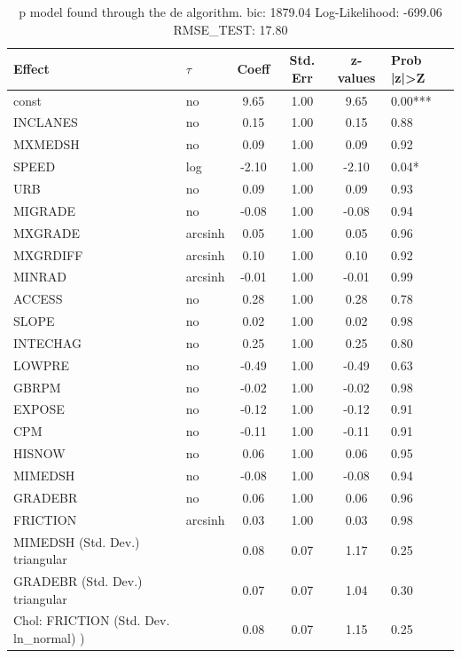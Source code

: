 \begin{table}
	\caption{p model found through the de algorithm. bic: 1879.04 Log-Likelihood: -699.06 RMSE_TEST: 17.80}
	\begin{center}
		\begin{tabular}{|l|l|c|c|c|l|}
			\hline
			Effect & $\tau$ & Coeff & Std. Err & z-values & Prob |z|>Z \\
			\hline
			const & no & 9.65 & 1.00 & 9.65 & 0.00*** \\
			\hline
			INCLANES & no & 0.15 & 1.00 & 0.15 & 0.88 \\
			\hline
			MXMEDSH & no & 0.09 & 1.00 & 0.09 & 0.92 \\
			\hline
			SPEED & log & -2.10 & 1.00 & -2.10 & 0.04* \\
			\hline
			URB & no & 0.09 & 1.00 & 0.09 & 0.93 \\
			\hline
			MIGRADE & no & -0.08 & 1.00 & -0.08 & 0.94 \\
			\hline
			MXGRADE & arcsinh & 0.05 & 1.00 & 0.05 & 0.96 \\
			\hline
			MXGRDIFF & arcsinh & 0.10 & 1.00 & 0.10 & 0.92 \\
			\hline
			MINRAD & arcsinh & -0.01 & 1.00 & -0.01 & 0.99 \\
			\hline
			ACCESS & no & 0.28 & 1.00 & 0.28 & 0.78 \\
			\hline
			SLOPE & no & 0.02 & 1.00 & 0.02 & 0.98 \\
			\hline
			INTECHAG & no & 0.25 & 1.00 & 0.25 & 0.80 \\
			\hline
			LOWPRE & no & -0.49 & 1.00 & -0.49 & 0.63 \\
			\hline
			GBRPM & no & -0.02 & 1.00 & -0.02 & 0.98 \\
			\hline
			EXPOSE & no & -0.12 & 1.00 & -0.12 & 0.91 \\
			\hline
			CPM & no & -0.11 & 1.00 & -0.11 & 0.91 \\
			\hline
			HISNOW & no & 0.06 & 1.00 & 0.06 & 0.95 \\
			\hline
			MIMEDSH & no & -0.08 & 1.00 & -0.08 & 0.94 \\
			\hline
			GRADEBR & no & 0.06 & 1.00 & 0.06 & 0.96 \\
			\hline
			FRICTION & arcsinh & 0.03 & 1.00 & 0.03 & 0.98 \\
			\hline
			MIMEDSH (Std. Dev.) triangular &  & 0.08 & 0.07 & 1.17 & 0.25 \\
			\hline
			GRADEBR (Std. Dev.) triangular &  & 0.07 & 0.07 & 1.04 & 0.30 \\
			\hline
			 Chol: FRICTION (Std. Dev. ln_normal) ) &  & 0.08 & 0.07 & 1.15 & 0.25 \\
			\hline
		\end{tabular}
	\end{center}
\end{table}